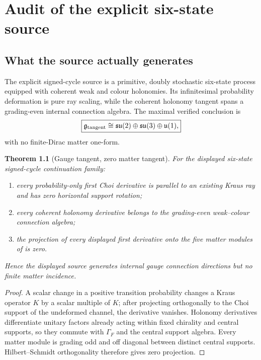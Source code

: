 \documentclass[11pt,oneside,openany]{book}
\numberwithin{equation}{chapter}
\newtheorem{theorem}{Theorem}[chapter]
\theoremstyle{definition}
\theoremstyle{remark}
\begin{document}
\chapter{Audit of the explicit six-state source}
\label{ch:six-state}

\section{What the source actually generates}
The explicit signed-cycle source is a primitive, doubly stochastic six-state process equipped with coherent weak and colour holonomies.  Its infinitesimal probability deformation is pure ray scaling, while the coherent holonomy tangent spans a grading-even internal connection algebra.  The maximal verified conclusion is
\[
 \boxed{
 \mathfrak g_{\rm tangent}
 \cong
 \mathfrak{su}(2)\oplus\mathfrak{su}(3)\oplus\mathfrak u(1),
 }
\]
with no finite-Dirac matter one-form.

\begin{theorem}[Gauge tangent, zero matter tangent]
\label{thm:gauge-not-matter}
For the displayed six-state signed-cycle continuation family:
\begin{enumerate}[label=\textup{(\roman*)},leftmargin=2.2em]
\item every probability-only first Choi derivative is parallel to an existing Kraus ray and has zero horizontal support rotation;
\item every coherent holonomy derivative belongs to the grading-even weak--colour connection algebra;
\item the projection of every displayed first derivative onto the five matter modules of  is zero.
\end{enumerate}
Hence the displayed source generates internal gauge connection directions but no finite matter incidence.
\end{theorem}

\begin{proof}
A scalar change in a positive transition probability changes a Kraus operator $K$ by a scalar multiple of $K$; after projecting orthogonally to the Choi support of the undeformed channel, the derivative vanishes.  Holonomy derivatives differentiate unitary factors already acting within fixed chirality and central supports, so they commute with $\Gamma_F$ and the central support algebra.  Every matter module is grading odd and off diagonal between distinct central supports.  Hilbert--Schmidt orthogonality therefore gives zero projection.
\end{proof}
\end{document}
